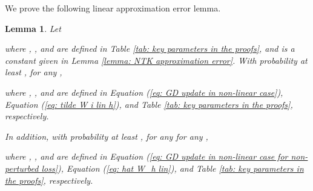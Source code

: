 \documentclass{article} \usepackage{iclr2023/iclr2023_conference,times}
\newtheorem{lemma}{Lemma}[section]
\begin{document}
We prove the following linear approximation error lemma. 

\begin{lemma}
Let 

where , ,  and  are defined in Table \ref{tab: key parameters in the proofs}, and  is a constant given in Lemma \ref{lemma: NTK approximation error}. 
With probability at least , for any , 

where , , and  are defined in Equation (\ref{eq: GD update in non-linear case}), Equation (\ref{eq: tilde W i lin h}), and Table \ref{tab: key parameters in the proofs}, respectively. 

In addition, with probability at least , for any for any ,

where , , and  are defined in Equation (\ref{eq: GD update in non-linear case for non-perturbed loss}), Equation (\ref{eq: hat W_h lin}), and Table \ref{tab: key parameters in the proofs}, respectively. 
\label{lemma: linear approximation of neural functions}
\end{lemma}
\end{document}
